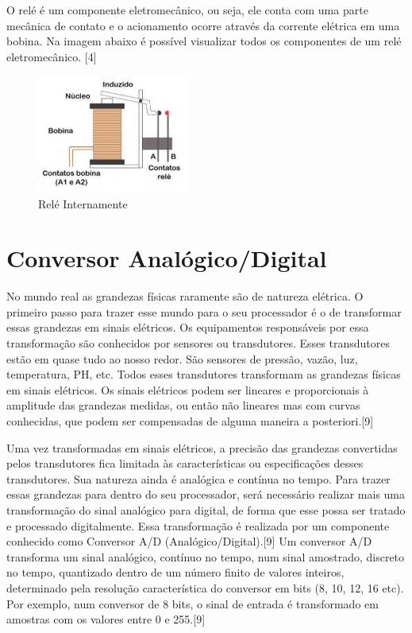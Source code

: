 O relé é um componente eletromecânico, ou seja, ele conta com uma parte mecânica de contato e o acionamento ocorre através da corrente elétrica em uma bobina. Na imagem abaixo é possível visualizar todos os componentes de um relé eletromecânico. [4]

\begin{figure}[H]
	\centering
	\includegraphics[width=5cm]{figuras/rele.png}
	\caption{Relé Internamente} \label{rele}
\end{figure}

\section{Conversor Analógico/Digital}

No mundo real as grandezas físicas raramente são de natureza elétrica. O primeiro passo para trazer esse mundo para o seu processador é o de transformar essas grandezas em sinais elétricos. Os equipamentos responsáveis por essa transformação são conhecidos por sensores ou transdutores. Esses transdutores estão em quase tudo ao nosso redor. São sensores de pressão, vazão, luz, temperatura, PH, etc. Todos esses transdutores transformam as grandezas físicas em sinais elétricos. Os sinais elétricos podem ser lineares e proporcionais à amplitude das grandezas medidas, ou então não lineares mas com curvas conhecidas, que podem ser compensadas de alguma maneira a posteriori.[9]

Uma vez transformadas em sinais elétricos, a precisão das grandezas convertidas pelos transdutores fica limitada às características ou especificações desses transdutores. Sua natureza ainda é analógica e contínua no tempo. Para trazer essas grandezas para dentro do seu processador, será necessário realizar mais uma transformação do sinal analógico para digital, de forma que esse possa ser tratado e processado digitalmente. Essa transformação é realizada por um componente conhecido como Conversor A/D (Analógico/Digital).[9]
Um conversor A/D transforma um sinal analógico, contínuo no tempo, num sinal amostrado, discreto no tempo, quantizado dentro de um número finito de valores inteiros, determinado pela resolução característica do conversor em bits (8, 10, 12, 16 etc). Por exemplo, num conversor de 8 bits, o sinal de entrada é transformado em amostras com os valores entre 0 e 255.[9]

